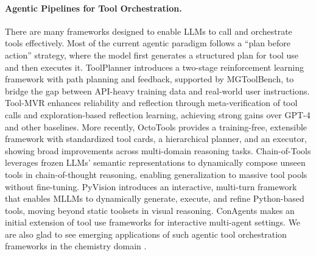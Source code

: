 \paragraph{Agentic Pipelines for Tool Orchestration.} There are many frameworks designed to enable LLMs to call and orchestrate tools effectively. Most of the current agentic paradigm follows a “plan before action” strategy, where the model first generates a structured plan for tool use and then executes it. ToolPlanner \citep{liu2025toolplanner} introduces a two-stage reinforcement learning framework with path planning and feedback, supported by MGToolBench, to bridge the gap between API-heavy training data and real-world user instructions.
Tool-MVR \citep{DBLP:journals/corr/abs-2506-04625} enhances reliability and reflection through meta-verification of tool calls and exploration-based reflection learning, achieving strong gains over GPT-4 and other baselines.
More recently, 
OctoTools \citep{lu2025octotoolsagenticframeworkextensible} provides a training-free, extensible framework with standardized tool cards, a hierarchical planner, and an executor, showing broad improvements across multi-domain reasoning tasks.
Chain-of-Tools \citep{DBLP:journals/corr/abs-2503-16779} leverages frozen LLMs’ semantic representations to dynamically compose unseen tools in chain-of-thought reasoning, enabling generalization to massive tool pools without fine-tuning.
PyVision \cite{DBLP:journals/corr/abs-2507-07998} introduces an interactive, multi-turn framework that enables MLLMs to dynamically generate, execute, and refine Python-based tools, moving beyond static toolsets in visual reasoning. ConAgents \cite{shi2024learning} makes an initial extension of tool use frameworks for interactive multi-agent settings.
We are also glad to see emerging applications of such agentic tool orchestration frameworks in the chemistry domain \citep{DBLP:journals/corr/abs-2505-02484}.

